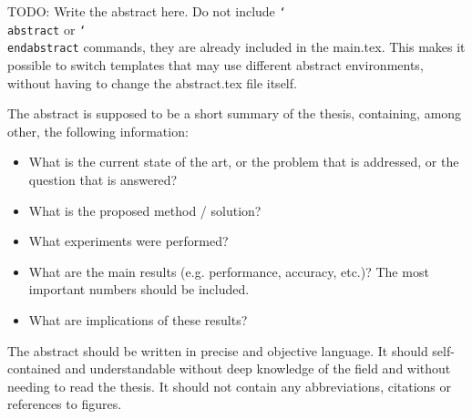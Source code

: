 TODO: Write the abstract here. Do not include \texttt{\char`\\abstract} or \texttt{\char`\\endabstract} commands, they are already included in the main.tex.
This makes it possible to switch templates that may use different abstract environments, without having to change the abstract.tex file itself.

The abstract is supposed to be a short summary of the thesis, containing, among other, the following information:
\begin{itemize}
    \item What is the current state of the art, or the problem that is addressed, or the question that is answered?
    \item What is the proposed method / solution?
    \item What experiments were performed?
    \item What are the main results (e.g. performance, accuracy, etc.)? The most important numbers should be included.
    \item What are implications of these results?
\end{itemize}

The abstract should be written in precise and objective language.
It should self-contained and understandable without deep knowledge of the field and without needing to read the thesis.
It should not contain any abbreviations, citations or references to figures.